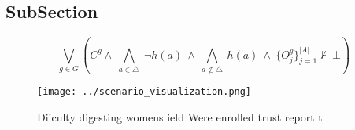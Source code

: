 \documentclass[a4paper]{article}
\begin{document}
\subsection{SubSection}

\[\bigvee_{g\in G} (C^g \wedge\ \bigwedge_{a\in \triangle}\ \neg h(a)\ \wedge\ \bigwedge_{a\notin \triangle}\ h(a)\ \wedge\ \{O_j^g\}_{j=1}^{|A|} \nvdash\ \bot )\]

\begin{figure}
\centering
\texttt{[image: ../scenario\_visualization.png]}
\caption{Diiculty digesting womens ield Were enrolled trust report t
}
\end{figure}
 
\end{document}

